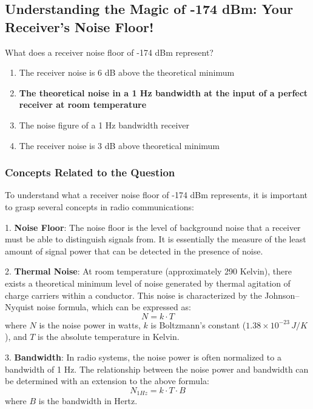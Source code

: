 \subsection{Understanding the Magic of -174 dBm: Your Receiver's Noise Floor!}


\begin{tcolorbox}[colback=gray!10, colframe=black, title=E4C05]
What does a receiver noise floor of -174 dBm represent? 
\begin{enumerate}[label=\Alph*.]
    \item The receiver noise is 6 dB above the theoretical minimum
    \item \textbf{The theoretical noise in a 1 Hz bandwidth at the input of a perfect receiver at room temperature}
    \item The noise figure of a 1 Hz bandwidth receiver
    \item The receiver noise is 3 dB above theoretical minimum
\end{enumerate} \end{tcolorbox}

\subsubsection{Concepts Related to the Question}

To understand what a receiver noise floor of -174 dBm represents, it is important to grasp several concepts in radio communications:

1. \textbf{Noise Floor}: The noise floor is the level of background noise that a receiver must be able to distinguish signals from. It is essentially the measure of the least amount of signal power that can be detected in the presence of noise.

2. \textbf{Thermal Noise}: At room temperature (approximately 290 Kelvin), there exists a theoretical minimum level of noise generated by thermal agitation of charge carriers within a conductor. This noise is characterized by the Johnson–Nyquist noise formula, which can be expressed as:
   \[
   N = k \cdot T
   \]
   where \( N \) is the noise power in watts, \( k \) is Boltzmann's constant (\( 1.38 \times 10^{-23} \, J/K \)), and \( T \) is the absolute temperature in Kelvin.

3. \textbf{Bandwidth}: In radio systems, the noise power is often normalized to a bandwidth of 1 Hz. The relationship between the noise power and bandwidth can be determined with an extension to the above formula:
   \[
   N_{1Hz} = k \cdot T \cdot B
   \]
   where \( B \) is the bandwidth in Hertz.


